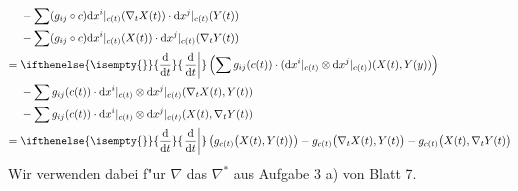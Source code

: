 \documentclass[paper=A4, twoside, chapterprefix=true, bibliography=totoc, headsepline]{scrbook}
\newcommand{\dop}{\mathrm{d}}
\newcommand{\difffrac}[3][]{\ifthenelse{\isempty{#1}}{\frac{\dop #2}{\dop #3}}{\left. \frac{\dop #2}{\dop #3} \right|_{#1}}}
\theoremstyle{plain}
\theoremstyle{nonumberplain}
\theoremstyle{empty}
\theoremstyle{break}
\begin{document}
\begin{description}[font=\normalfont\itshape,leftmargin=*]
\begin{align*}
		 & - \sum (g_{ij} \circ c) \dop x^{i}|_{c(t)} ( \nabla_t X(t)) \cdot \dop x^j|_{c(t)} (Y(t))\\
		 & - \sum (g_{ij} \circ c) \dop x^{i}|_{c(t)} (X(t)) \cdot \dop x^j|_{c(t)} (\nabla_tY(t))\\
		={}& \difffrac{}{t} \left( \sum g_{ij}(c(t)) \cdot (\dop x^{i}|_{c(t)} \otimes \dop x^j|_{c(t)}) (X(t), Y(y)) \right)\\
		 & - \sum g_{ij}(c(t)) \cdot \dop x^{i}|_{c(t)} \otimes \dop x^{j}|_{c(t)} (\nabla_tX(t), Y(t))\\
		 & - \sum g_{ij}(c(t)) \cdot \dop x^{i}|_{c(t)} \otimes \dop x^{j}|_{c(t)} (X(t), \nabla_tY(t))\\
		={}& \difffrac{}{t}\left( g_{c(t)}\big(X(t), Y(t)\big) \right) - g_{c(t)}\big(\nabla_t X(t), Y(t)\big) - g_{c(t)}\big(X(t), \nabla_t Y(t)\big)
	\end{align*}
	Wir verwenden dabei f"ur $\nabla$ das $\nabla^*$ aus Aufgabe 3 a) von Blatt 7.
\end{description}
\end{document}
